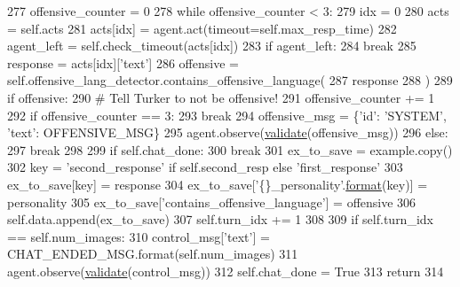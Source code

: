 \begin{DoxyCode}
277             offensive\_counter = 0
278             \textcolor{keywordflow}{while} offensive\_counter < 3:
279                 idx = 0
280                 acts = self.acts
281                 acts[idx] = agent.act(timeout=self.max\_resp\_time)
282                 agent\_left = self.check\_timeout(acts[idx])
283                 \textcolor{keywordflow}{if} agent\_left:
284                     \textcolor{keywordflow}{break}
285                 response = acts[idx][\textcolor{stringliteral}{'text'}]
286                 offensive = self.offensive\_lang\_detector.contains\_offensive\_language(
287                     response
288                 )
289                 \textcolor{keywordflow}{if} offensive:
290                     \textcolor{comment}{# Tell Turker to not be offensive!}
291                     offensive\_counter += 1
292                     \textcolor{keywordflow}{if} offensive\_counter == 3:
293                         \textcolor{keywordflow}{break}
294                     offensive\_msg = \{\textcolor{stringliteral}{'id'}: \textcolor{stringliteral}{'SYSTEM'}, \textcolor{stringliteral}{'text'}: OFFENSIVE\_MSG\}
295                     agent.observe(\hyperlink{namespaceparlai_1_1core_1_1worlds_afc3fad603b7bce41dbdc9cdc04a9c794}{validate}(offensive\_msg))
296                 \textcolor{keywordflow}{else}:
297                     \textcolor{keywordflow}{break}
298 
299             \textcolor{keywordflow}{if} self.chat\_done:
300                 \textcolor{keywordflow}{break}
301             ex\_to\_save = example.copy()
302             key = \textcolor{stringliteral}{'second\_response'} \textcolor{keywordflow}{if} self.second\_resp \textcolor{keywordflow}{else} \textcolor{stringliteral}{'first\_response'}
303             ex\_to\_save[key] = response
304             ex\_to\_save[\textcolor{stringliteral}{'\{\}\_personality'}.\hyperlink{namespaceparlai_1_1chat__service_1_1services_1_1messenger_1_1shared__utils_a32e2e2022b824fbaf80c747160b52a76}{format}(key)] = personality
305             ex\_to\_save[\textcolor{stringliteral}{'contains\_offensive\_language'}] = offensive
306             self.data.append(ex\_to\_save)
307             self.turn\_idx += 1
308 
309         \textcolor{keywordflow}{if} self.turn\_idx == self.num\_images:
310             control\_msg[\textcolor{stringliteral}{'text'}] = CHAT\_ENDED\_MSG.format(self.num\_images)
311             agent.observe(\hyperlink{namespaceparlai_1_1core_1_1worlds_afc3fad603b7bce41dbdc9cdc04a9c794}{validate}(control\_msg))
312         self.chat\_done = \textcolor{keyword}{True}
313         \textcolor{keywordflow}{return}
314 
\end{DoxyCode}
\mbox{\label{classimage__chat__collection_1_1worlds_1_1MTurkImageChatWorld_a02bb22cb19e1f1ccecab9043a18741e1}} 
